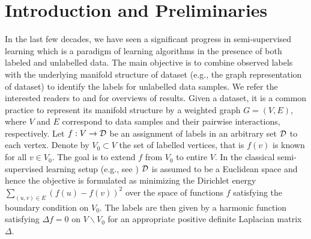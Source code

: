 \documentclass[letterpaper]{article} %
\begin{document}
\section{Introduction and Preliminaries}
In the last few decades, we have seen a significant progress in semi-supervised learning which is a paradigm of learning algorithms in the presence of both labeled and unlabelled data. The main objective is to combine observed labels with the underlying manifold structure of dataset (e.g., the graph representation of dataset) to identify the labels for unlabelled data samples. We refer the interested readers to \cite{Seeger01learningwith} and \cite{Zhu06semi-supervisedlearning} for overviews of results. Given a dataset, it is a common practice to represent its manifold structure by a weighted graph $G=(V, E)$, where $V$ and $E$ correspond to data samples and their pairwise interactions, respectively. Let $f:V\to{\mathcal D}$ be an assignment of labels in an arbitrary set ${\mathcal D}$ to each vertex. Denote by $V_0\subset V$ the set of labelled vertices, that is $f(v)$ is known for all $v\in V_0$. The goal is to extend $f$ from $V_0$ to entire $V$. In the classical semi-supervised learning setup (e.g., see \cite{Zhu:SSL_Gaussian}) ${\mathcal D}$ is assumed to be a Euclidean space and hence the objective is formulated as minimizing the Dirichlet energy $\sum_{(u, v)\in E}(f(u)-f(v))^2$ over the space of functions $f$ satisfying the boundary condition on $V_0$. The labels are then given by a harmonic function satisfying $\Delta f=0$ on $V\backslash V_0$ for an appropriate positive definite Laplacian matrix $\Delta$.   
\end{document}
